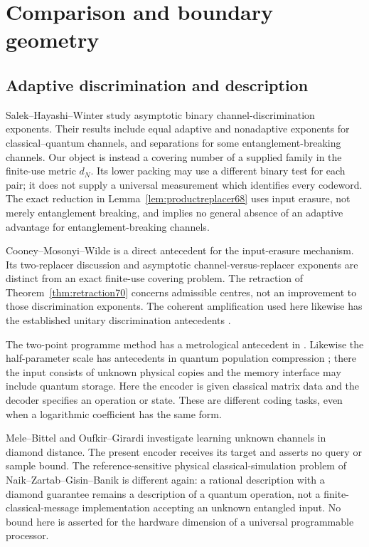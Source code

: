 \section{Comparison and boundary geometry}
\subsection{Adaptive discrimination and description}
Salek--Hayashi--Winter \cite[Sections~II--V]{SHW68} study asymptotic
binary channel-discrimination exponents. Their results include equal
adaptive and nonadaptive exponents for classical--quantum channels,
and separations for some entanglement-breaking channels. Our object
is instead a covering number of a supplied family in the finite-use
metric $d_N$. Its lower packing may use a different binary test for
each pair; it does not supply a universal measurement which identifies
every codeword. The exact reduction in
Lemma~\ref{lem:productreplacer68} uses input erasure, not merely
entanglement breaking, and implies no general absence of an adaptive
advantage for entanglement-breaking channels.

Cooney--Mosonyi--Wilde \cite{CMW70} is a direct antecedent for the
input-erasure mechanism. Its two-replacer discussion and asymptotic
channel-versus-replacer exponents are distinct from an exact finite-use
covering problem. The retraction of Theorem~\ref{thm:retraction70} concerns
admissible centres, not an improvement to those discrimination exponents.
The coherent amplification used here likewise has the established unitary
discrimination antecedents \cite{Acin70,DFY70}.

The two-point programme method has a metrological antecedent in
\cite{DKG67}. Likewise the half-parameter scale has antecedents in
quantum population compression \cite{YBCH68}; there the input consists
of unknown physical copies and the memory interface may include
quantum storage. Here the encoder is given classical matrix data and
the decoder specifies an operation or state. These are different
coding tasks, even when a logarithmic coefficient has the same form.

Mele--Bittel \cite{MB67} and Oufkir--Girardi \cite{OG67} investigate
learning unknown channels in diamond distance. The present encoder
receives its target and asserts no query or sample bound. The
reference-sensitive physical classical-simulation problem of
Naik--Zartab--Gisin--Banik \cite{NZGB67} is different again: a rational
description with a diamond guarantee remains a description of a
quantum operation, not a finite-classical-message implementation
accepting an unknown entangled input. No bound here is asserted for
the hardware dimension of a universal programmable processor.

